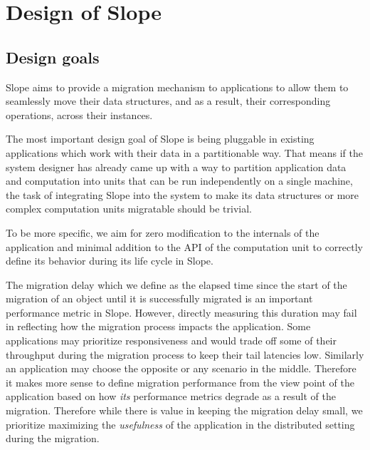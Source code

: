 \chapter{Design of Slope}
\label{chap:design}



\section{Design goals}

Slope aims to provide a migration mechanism to applications to allow them to
seamlessly move their data structures, and as a result, their corresponding
operations, across their instances.

The most important design goal of Slope is being pluggable in existing
applications which work with their data in a partitionable way. That means if
the system designer has already came up with a way to partition
application data and computation into units that can be run independently on a
single machine, the task of integrating Slope into the system to make its data
structures or more complex computation units migratable should be trivial.

To be more specific, we aim for zero modification to the internals of the
application and minimal addition to the API of the computation unit to
correctly define its behavior during its life cycle in Slope.

The migration delay which we define as the elapsed time since the start of the
migration of an object until it is successfully migrated is an important
performance metric in Slope. However, directly measuring this duration may fail
in reflecting how the migration process impacts the application. Some
applications may prioritize responsiveness and would trade off some of their
throughput during the migration process to keep their tail latencies low.
Similarly an application may choose the opposite or any scenario in the middle.
Therefore it makes more sense to define migration performance from the view
point of the application based on how \emph{its} performance metrics degrade
as a result of the migration. Therefore while there is value in keeping the
migration delay small, we prioritize maximizing the \emph{usefulness} of the
application in the distributed setting during the migration.

